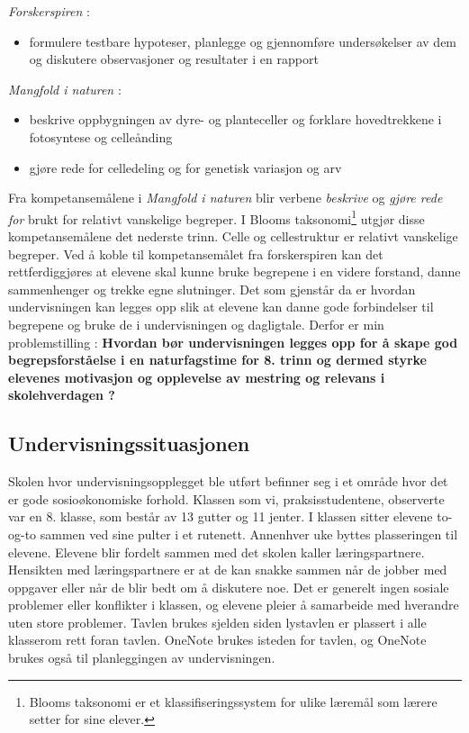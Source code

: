 \documentclass[main.tex]{subfiles}
\begin{document}
\begin{displayquote}
\emph{Forskerspiren} :
\begin{itemize}
\vspace{-2mm}
\item formulere testbare hypoteser, planlegge og gjennomføre undersøkelser 
av dem og diskutere observasjoner og resultater i en rapport
\end{itemize}
\emph{Mangfold i naturen} :
\begin{itemize}
\vspace{-2mm}
\item beskrive oppbygningen av dyre- og planteceller og forklare hovedtrekkene i fotosyntese 
og celleånding
\vspace{-3mm}
\item gjøre rede for celledeling og for genetisk variasjon og arv
\end{itemize}
\end{displayquote} 
Fra kompetansemålene i \emph{Mangfold i naturen} blir verbene \emph{beskrive} og \emph{gjøre rede for} brukt 
for relativt vanskelige begreper. I Blooms taksonomi\footnote{Blooms taksonomi er et klassifiseringssystem 
for ulike læremål som lærere setter for sine elever.} utgjør disse kompetansemålene det nederste trinn. 
Celle og cellestruktur er relativt vanskelige begreper. Ved å koble til 
kompetansemålet fra forskerspiren kan det rettferdiggjøres at elevene skal kunne bruke begrepene i en videre forstand, 
danne sammenhenger og trekke egne slutninger.
Det som gjenstår da er hvordan undervisningen kan legges opp slik at 
elevene kan danne gode forbindelser til begrepene og bruke de i undervisningen og dagligtale.
\newline
\newline
Derfor er min problemstilling :
\newline
\newline
\textbf{Hvordan bør undervisningen legges opp for å skape god begrepsforståelse i en naturfagstime for 8. trinn 
og dermed styrke elevenes motivasjon og opplevelse av mestring og relevans i skolehverdagen ?}

\subsection*{Undervisningssituasjonen}
Skolen hvor undervisningsopplegget ble utført befinner seg i et område hvor det er gode sosioøkonomiske forhold. 
Klassen som vi, praksisstudentene, observerte var en 8. klasse, som består av 13 gutter og 11 jenter. 
I klassen sitter elevene to-og-to sammen ved sine pulter i et rutenett. Annenhver uke byttes plasseringen til elevene. 
Elevene blir fordelt sammen med det skolen kaller læringspartnere. Hensikten med læringspartnere er at de kan snakke
sammen når de jobber med oppgaver eller når de blir bedt om å diskutere noe.  Det er generelt ingen sosiale problemer 
eller konflikter i klassen, og elevene pleier å samarbeide med hverandre uten store problemer. Tavlen brukes sjelden 
siden lystavlen er plassert i alle klasserom rett foran tavlen. OneNote brukes isteden for tavlen, og OneNote brukes 
også til planleggingen av undervisningen.
\end{document}
